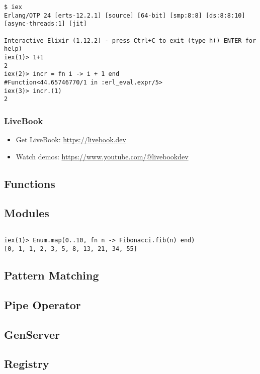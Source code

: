 {\begin{verbatim}
$ iex
Erlang/OTP 24 [erts-12.2.1] [source] [64-bit] [smp:8:8] [ds:8:8:10] [async-threads:1] [jit]

Interactive Elixir (1.12.2) - press Ctrl+C to exit (type h() ENTER for help)
iex(1)> 1+1
2
iex(2)> incr = fn i -> i + 1 end
#Function<44.65746770/1 in :erl_eval.expr/5>
iex(3)> incr.(1)
2
\end{verbatim}

\subsubsection{LiveBook}

\begin{itemize}
  \item Get LiveBook: \url{https://livebook.dev}
  \item Watch demos: \url{https://www.youtube.com/@livebookdev}
\end{itemize}

\subsection{Functions}

\subsection{Modules}

\inputminted[fontsize=\normalsize]{elixir}{../src/elixir/fibonacci.ex}

\begin{verbatim}
iex(1)> Enum.map(0..10, fn n -> Fibonacci.fib(n) end)
[0, 1, 1, 2, 3, 5, 8, 13, 21, 34, 55]
\end{verbatim}

\subsection{Pattern Matching}

\subsection{Pipe Operator}

\subsection{GenServer}

\subsection{Registry}

}
